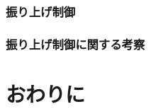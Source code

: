 \documentclass[a4j,11pt,twoside]{jbook}
\begin{document}
\subsection{振り上げ制御}

\subsection{振り上げ制御に関する考察}



\chapter{おわりに}





\end{document}
